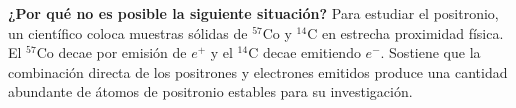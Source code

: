 \item \textbf{¿Por qué no es posible la siguiente situación?}
Para estudiar el positronio, un científico coloca muestras sólidas de $^{57}\text{Co}$ y $^{14}\text{C}$ en estrecha proximidad física. El $^{57}\text{Co}$ decae por emisión de $e^+$ y el $^{14}\text{C}$ decae emitiendo $e^-$. Sostiene que la combinación directa de los positrones y electrones emitidos produce una cantidad abundante de átomos de positronio estables para su investigación.